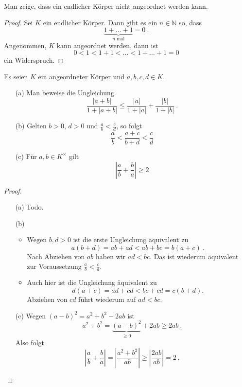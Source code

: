 \setcounter{aufgabe}{3}
\begin{aufgabe}
	Man zeige, dass ein endlicher Körper nicht angeordnet werden kann.
\end{aufgabe}
\begin{proof}
	Sei $K$ ein endlicher Körper. Dann gibt es ein $n \in \mathbb N$ so, dass
	\[
		\underbrace{ 1 + \dots + 1}_{n \text{ mal}} = 0 \ .
	\]
	Angenommen, $K$ kann angeordnet werden, dann ist
	\[
		0 < 1 < 1 + 1 < \dots < 1 + \dots + 1 = 0
	\]
	ein Widerspruch.
\end{proof}

\setcounter{aufgabe}{9}
\begin{aufgabe}
	Es seien $K$ ein angeordneter Körper und $a, b, c, d \in K$.
	\begin{enumerate}
		\item[(a)] Man beweise die Ungleichung
			\[
				\frac{| a + b|}{1 + |a+b|} \leq \frac{|a|}{1+|a|} + \frac{|b|}{1+|b|} \ .
			\]
		\item[(b)] Gelten $b > 0$, $d > 0$ und $\frac a b < \frac c d$, so folgt
			\[
				\frac a b < \frac{a + c}{b + d} < \frac c d
			\]
		\item[(c)] Für $a, b \in K^\times$ gilt
			\[
				\left| \frac a b + \frac b a \right| \geq 2
			\]
	\end{enumerate}
\end{aufgabe}
\begin{proof}
	\begin{enumerate}
		\item[(a)] Todo. %
		\item[(b)] 
			\begin{itemize}
				\item Wegen $b, d > 0$ ist die erste Ungleichung äquivalent zu 
					\[
						a(b+d) = ab + ad < ab + bc = b(a+c) \ .
					\]
					Nach Abziehen von $ab$ haben wir $ad < bc$. Das ist wiederum äquivalent
					zur Voraussetzung $\frac a b < \frac c d$.
				\item Auch hier ist die Ungleichung äquivalent zu 
					\[
						d(a+c) = ad + cd < bc + cd = c ( b+d) .
					\]
					Abziehen von $cd$ führt wiederum auf $ad < bc$.
			\end{itemize}
		\item[(c)] Wegen $(a-b)^2 = a^2 + b^2 - 2ab$ ist
			\[
				a^2 + b^2 = \underbrace{ (a-b)^2 }_{\geq 0} + 2ab \geq 2ab \ .
			\]
			Also folgt
			\[
				\left| \frac a b + \frac b a \right| = \left| \frac{a^2 + b^2}{ab} \right|
					\geq \left| \frac{2ab}{ab} \right| = 2 \ .
			\]
	\end{enumerate}
\end{proof}


